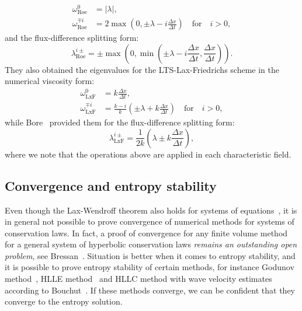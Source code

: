 \begin{subequations}
\begin{align}
\omega_{\text{Roe}}^0 & = | \lambda |, \\
\omega_{\text{Roe}}^{\mp i} & = 2 \max \left( 0, \pm \lambda - i \frac{\Delta x}{\Delta t} \right) \quad \text{for} \quad i > 0,
\end{align}
\end{subequations}
and the flux-difference splitting form:
\begin{equation}
\lambda_{\text{Roe}}^{i\pm} = \pm \max \left( 0, \min \left( \pm \lambda - i \frac{\Delta x}{\Delta t}, \frac{\Delta x}{\Delta t} \right) \right).
\end{equation}
They also obtained the eigenvalues for the LTS-Lax-Friedrichs scheme in the numerical viscosity form:
\begin{subequations}
\begin{align}
\omega_{\text{LxF}}^0 & = k \frac{\Delta x}{\Delta t}, \\
\omega_{\text{LxF}}^{\mp i} & = \frac{k-i}{k} \left( \pm \lambda + k \frac{\Delta x}{\Delta t} \right) \quad \text{for} \quad i > 0,
\end{align}
\end{subequations}
while Bore~\cite{bor15} provided them for the flux-difference splitting form:
\begin{equation}
\lambda_{\text{LxF}}^{i\pm} = \frac{1}{2k} \left( \lambda \pm k \frac{\Delta x}{\Delta t} \right),
\end{equation}
where we note that the operations above are applied in each characteristic field.

\subsection{Convergence and entropy stability}

Even though the Lax-Wendroff theorem also holds for systems of equations~\cite{lev02}, it is in general not possible to prove convergence of numerical methods for systems of conservation laws. In fact, a proof of convergence for any finite volume method for a general system of hyperbolic conservation laws \textit{remains an outstanding open problem}, see Bressan~\cite{bre11}. Situation is better when it comes to entropy stability, and it is possible to prove entropy stability of certain methods, for instance Godunov method~\cite{lev01}, HLLE method~\cite{ein88} and HLLC method with wave velocity estimates according to Bouchut~\cite{bou04}. If these methods converge, we can be confident that they converge to the entropy solution. 

